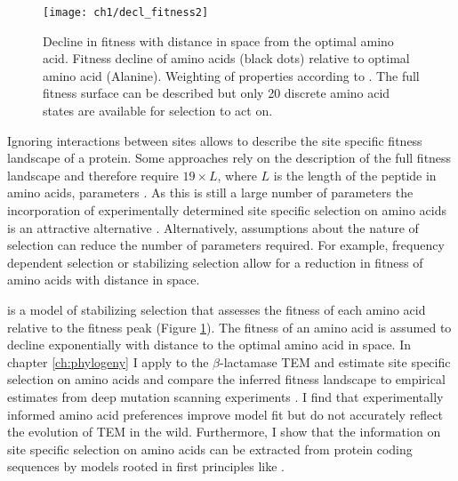 \singlespacing
\begin{figure}
     \centering
	\texttt{[image: ch1/decl\_fitness2]}
	\caption{Decline in fitness with distance in \PC space from the optimal amino acid. 
	Fitness decline of amino acids (black dots) relative to optimal amino acid (Alanine). Weighting of \PC properties according to \citet{grantham1974}.
	The full fitness surface can be described but only 20 discrete amino acid states are available for selection to act on.}
	\label{fig:decl_fit}
\end{figure}
\doublespacing

Ignoring interactions between sites allows to describe the site specific fitness landscape of a protein.
Some approaches rely on the description of the full fitness landscape and therefore require $19 \times L$, where $L$ is the length of the peptide in amino acids, parameters \citep{LartillotAndPhilippe2004,le2008,wang2008,holder2008,wu2013,tamuri2014}.
As this is still a large number of parameters the incorporation of experimentally determined site specific selection on amino acids is an attractive alternative \citep{bloom2014, thyagarajan2014, bloom2017}. 
Alternatively, assumptions about the nature of selection can reduce the number of parameters required.
For example, frequency dependent selection \citep{GoldmanAndYang1994, MuseAndGaut1994, thorne1996} or stabilizing selection \citep{beaulieu2019} allow for a reduction in fitness of amino acids with distance in \PC space.

\selac \citep{beaulieu2019} is a model of stabilizing selection that assesses the fitness of each amino acid relative to the fitness peak (Figure \ref{fig:decl_fit}).
The fitness of an amino acid is assumed to decline exponentially with distance to the optimal amino acid in \PC space.
In chapter \ref{ch:phylogeny} I apply \selac to the $\beta$-lactamase TEM and estimate site specific selection on amino acids and compare the inferred fitness landscape to empirical estimates from deep mutation scanning experiments \citep{stiffler2016}.
I find that experimentally informed amino acid preferences improve model fit but do not accurately reflect the evolution of TEM in the wild.
Furthermore, I show that the information on site specific selection on amino acids can be extracted from protein coding sequences by models rooted in first principles like \selac.




